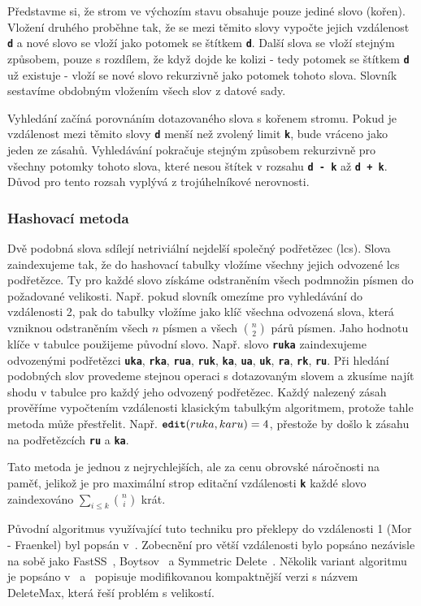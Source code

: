 \documentclass[11pt,letterpaper,oneside,openright]{book}
\newcommand{\bftt}[1]{\texttt{\textbf{#1}}}
\begin{document}
Představme si, že strom ve výchozím stavu obsahuje pouze jediné slovo (kořen).
Vložení druhého proběhne tak, že se mezi těmito slovy vypočte jejich vzdálenost
\bftt{d} a nové slovo se vloží jako potomek se štítkem \bftt{d}. Další slova se
vloží stejným způsobem, pouze s rozdílem, že když dojde ke kolizi - tedy
potomek se štítkem \bftt{d} už existuje - vloží se nové slovo rekurzivně jako
potomek tohoto slova. Slovník sestavíme obdobným vložením všech slov z datové sady.

Vyhledání začíná porovnáním dotazovaného slova s kořenem stromu. Pokud je
vzdálenost mezi těmito slovy \bftt{d} menší než zvolený limit \bftt{k}, bude
vráceno jako jeden ze zásahů. Vyhledávání pokračuje stejným způsobem rekurzivně
pro všechny potomky tohoto slova, které nesou štítek v rozsahu \bftt{d - k} až
\bftt{d + k}. Důvod pro tento rozsah vyplývá z trojúhelníkové nerovnosti.

\subsubsection{Hashovací metoda}
Dvě podobná slova sdílejí netriviální nejdelší společný podřetězec (lcs). Slova
zaindexujeme tak, že do hashovací tabulky vložíme všechny jejich odvozené lcs
podřetězce. Ty pro každé slovo získáme odstraněním všech podmnožin písmen do
požadované velikosti. Např. pokud slovník omezíme pro vyhledávání do
vzdálenosti 2, pak do tabulky vložíme jako klíč všechna odvozená slova, která
vzniknou odstraněním všech $n$ písmen a všech ${n \choose 2}$ párů písmen. Jaho
hodnotu klíče v tabulce použijeme původní slovo. Např. slovo \bftt{ruka}
zaindexujeme odvozenými podřetězci \bftt{uka}, \bftt{rka}, \bftt{rua},
\bftt{ruk}, \bftt{ka}, \bftt{ua}, \bftt{uk}, \bftt{ra}, \bftt{rk}, \bftt{ru}.
Při hledání podobných slov provedeme stejnou operaci s dotazovaným slovem a
zkusíme najít shodu v tabulce pro každý jeho odvozený podřetězec. Každý
nalezený zásah prověříme vypočtením vzdálenosti klasickým tabulkým algoritmem,
protože tahle metoda může přestřelit. Např. $\bftt{edit}(ruka, karu) = 4$,
přestože by došlo k zásahu na podřetězcích \bftt{ru} a \bftt{ka}.

Tato metoda je jednou z nejrychlejších, ale za cenu obrovské náročnosti na
paměť, jelikož je pro maximální strop editační vzdálenosti \bftt{k} každé slovo
zaindexováno $\sum_{i \leq k} {n \choose i}$ krát.

Původní algoritmus  využívající tuto techniku pro překlepy do vzdálenosti 1
(Mor - Fraenkel) byl popsán v~\cite{Mor:1982:HCM:358728.358752}. Zobecnění pro
větší vzdálenosti bylo popsáno nezávisle na sobě jako FastSS~\cite{FastSS},
Boytsov~\cite{Boytsov:2011:IMA:1963190.1963191} a Symmetric
Delete~\cite{Faroo_symmetric_delete}. Několik variant algoritmu je popsáno
v~\cite{FastSS} a~\cite{Bast:2013:EFS:2457465.2457470} popisuje modifikovanou
kompaktnější verzi s názvem DeleteMax, která řeší problém s velikostí.
\end{document}
